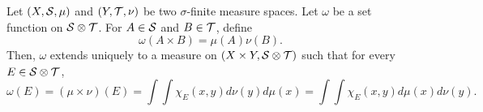 \begin{theorem}\label{thm:product_measure}
    Let $(X,\S,\mu)$ and $(Y,\T,\nu)$ be two $\sigma$-finite measure spaces. 
    Let $\omega$ be a set function on $\S\otimes\T$. For $A\in\S$ and 
    $B\in\T$, define 
    \begin{equation*}
        \omega(A\times B) = \mu(A)\nu(B).
    \end{equation*}
    Then, $\omega$ extends uniquely to a measure on $(X\times Y,\S\otimes\T)$ 
    such that for every $E\in\S\otimes\T$, 
    \begin{equation*}
        \omega(E) = (\mu\times\nu)(E) = \int\int \chi_E(x,y)d\nu(y)d\mu(x) = \int\int \chi_E(x,y)d\mu(x)d\nu(y).
    \end{equation*}
\end{theorem}
